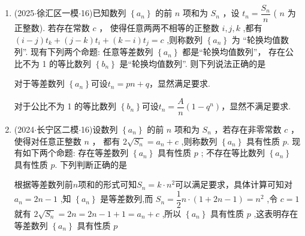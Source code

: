 \begin{enumerate}
    \begin{jieda}
        对于  : 必要性: 若 ${a}_{1} \cdot  {a}_{2} \cdot  \cdots  \cdot  {a}_{k} = 0$ ,不妨设 ${a}_{i} =  0\left( {1 \leq  i \leq  k}\right)$ ,则 ${S}_{{2i} - 1} = \left( {{2i} - 1}\right) {a}_{i} = 0$ ,即必要性成立; 充分性: 举反例: 当 ${a}_{n} = {2n} - 3$ 时,则 ${S}_{2} = 0$ ,故 ${S}_{1} \cdot  {S}_{2} \cdot  \cdots  \cdot  {S}_{{2k} - 1} = 0$ ,但是 ${a}_{1} \cdot  {a}_{2} \cdot  \cdots  \cdot  {a}_{k} \neq  0$ ,即充分性不成立; 综上所述,  为真命题; 
        
        对于  : ${a}_{k} + {a}_{k + 1} = 0 \Longleftrightarrow q = -1 \Longleftrightarrow S_{2m} = 0$
    \end{jieda}

    \item (2025$\cdot$徐汇区一模$\cdot$16)已知数列 $\left\{  {a}_{n}\right\}$ 的前 $n$ 项和为 ${S}_{n}$ ，设 ${t}_{n} = \dfrac{{S}_{n}}{n}$ ( $n$ 为正整数). 若存在常数 $c$ ， 使得任意两两不相等的正整数 $i,j,k$ ,都有 $\left( {i - j}\right) {t}_{k} + \left( {j - k}\right) {t}_{i} + \left( {k - i}\right) {t}_{j} = c$ ,则称数列 $\left\{  {a}_{n}\right\}$ 为 “轮换均值数列”. 现有下列两个命题:   任意等差数列 $\left\{  {a}_{n}\right\}$ 都是“轮换均值数列”，   存在公比不为 1 的等比数列 $\left\{  {b}_{n}\right\}$ 是“轮换均值数列”. 则下列说法正确的是 
    \begin{jieda}
        对于等差数列 $\left\{  {a}_{n}\right\}$可设$t_n = pn+q$，显然满足要求.

        对于公比不为 1 的等比数列 $\left\{  {b}_{n}\right\}$可设$t_n = \dfrac{A}{n}(1-q^n)$，显然不满足要求.
    \end{jieda}

    \item (2024$\cdot$长宁区二模$\cdot$16)设数列 $\left\{  {a}_{n}\right\}$ 的前 $n$ 项和为 ${S}_{n}$ ，若存在非零常数 $c$ ，使得对任意正整数 $n$ ， 都有 $2\sqrt{{S}_{n}} = {a}_{n} + c$ ,则称数列 $\left\{  {a}_{n}\right\}$ 具有性质 $p$. 现有如下两个命题:   存在等差数列 $\left\{  {a}_{n}\right\}$ 具有性质 $p$ ;    不存在等比数列 $\left\{  {a}_{n}\right\}$ 具有性质 $p$. 下列判断正确的是 
    \begin{jieda}
        根据等差数列前$n$项和的形式可知$S_n = k\cdot n^2$可以满足要求，具体计算可知对 ${a}_{n} = {2n} - 1$ ,知 $\left\{  {a}_{n}\right\}$ 是等差数列,而 ${S}_{n} =  \dfrac{1}{2}n \cdot  \left( {1 + {2n} - 1}\right)  = {n}^{2}$ ,令 $c = 1$ 就有 $2\sqrt{{S}_{n}} = {2n} = {2n} -  1 + 1 = {a}_{n} + c$ ,所以 $\left\{  {a}_{n}\right\}$ 具有性质 $p$ ,这表明存在等差数列 $\left\{  {a}_{n}\right\}$ 具有性质 $p$
        

\end{jieda}
\end{enumerate}
